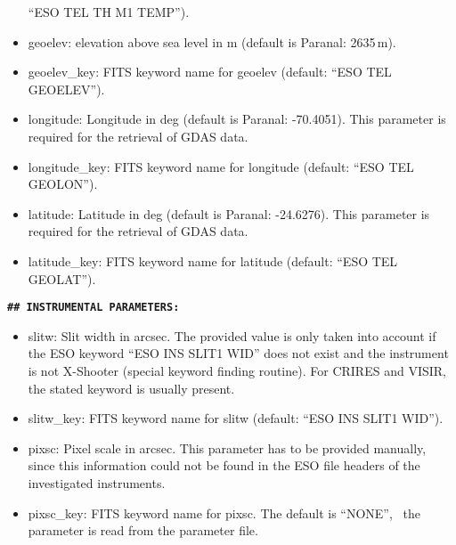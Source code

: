 \begin{itemize}
``ESO TEL TH M1 TEMP'').
\item {\sc geoelev}: elevation above sea level in m (default is Paranal:
2635\,m).
\item {\sc geoelev\_key}: FITS keyword name for {\sc geoelev} (default:
``ESO TEL GEOELEV'').
\item {\sc longitude}: Longitude in deg (default is Paranal: -70.4051). This
parameter is required for the retrieval of GDAS data.
\item {\sc longitude\_key}: FITS keyword name for {\sc longitude} (default:
``ESO TEL GEOLON'').
\item {\sc latitude}: Latitude in deg (default is Paranal: -24.6276). This
parameter is required for the retrieval of GDAS data.
\item {\sc latitude\_key}: FITS keyword name for {\sc latitude} (default:
``ESO TEL GEOLAT'').

\end{itemize}
{\bf\large\tt\#\# INSTRUMENTAL PARAMETERS:}
\begin{itemize}
\item {\sc slitw}: Slit width in arcsec. The provided value is only taken into
account if the ESO keyword ``ESO INS SLIT1 WID'' does not exist and the
instrument is not X-Shooter (special keyword finding routine). For CRIRES and
VISIR, the stated keyword is usually present.
\item {\sc slitw\_key}: FITS keyword name for {\sc slitw} (default:
``ESO INS SLIT1 WID'').
\item {\sc pixsc}: Pixel scale in arcsec. This parameter has to be provided
manually, since this information could not be found in the ESO file headers of
the investigated instruments.
\item {\sc pixsc\_key}: FITS keyword name for {\sc pixsc}. The default is
``NONE'', \ie\ the parameter is read from the parameter file.
\end{itemize}

